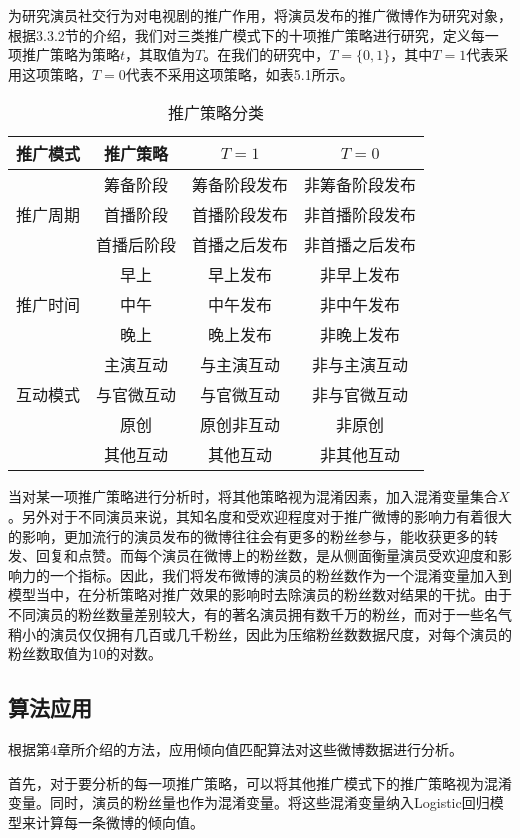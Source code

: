 为研究演员社交行为对电视剧的推广作用，将演员发布的推广微博作为研究对象，根据3.3.2节的介绍，我们对三类推广模式下的十项推广策略进行研究，定义每一项推广策略为策略$t$，其取值为$T$。在我们的研究中，$T = \{0, 1\}$，其中$T = 1$代表采用这项策略，$T = 0$代表不采用这项策略，如表5.1所示。

\begin{table}[!htbp]
\centering
\caption{推广策略分类}
\begin{tabular}{|c|c|c|c|} \hline
推广模式&推广策略&$T=1$&$T=0$\\ \hline
\multirow{3}{*}{推广周期} & 筹备阶段&筹备阶段发布&非筹备阶段发布\\%
&首播阶段&首播阶段发布&非首播阶段发布\\%
&首播后阶段&首播之后发布&非首播之后发布\\ \hline
\multirow{3}{*}{推广时间} &早上&早上发布&非早上发布\\%
&中午&中午发布&非中午发布\\%
&晚上&晚上发布&非晚上发布\\ \hline
\multirow{3}{*}{互动模式} &主演互动&与主演互动&非与主演互动\\%
&与官微互动&与官微互动&非与官微互动\\%
&原创&原创非互动&非原创\\ 
&其他互动&其他互动&非其他互动\\ \hline
\end{tabular}
\end{table}

当对某一项推广策略进行分析时，将其他策略视为混淆因素，加入混淆变量集合$X$。另外对于不同演员来说，其知名度和受欢迎程度对于推广微博的影响力有着很大的影响，更加流行的演员发布的微博往往会有更多的粉丝参与，能收获更多的转发、回复和点赞。而每个演员在微博上的粉丝数，是从侧面衡量演员受欢迎度和影响力的一个指标。因此，我们将发布微博的演员的粉丝数作为一个混淆变量加入到模型当中，在分析策略对推广效果的影响时去除演员的粉丝数对结果的干扰。由于不同演员的粉丝数量差别较大，有的著名演员拥有数千万的粉丝，而对于一些名气稍小的演员仅仅拥有几百或几千粉丝，因此为压缩粉丝数数据尺度，对每个演员的粉丝数取值为10的对数。

\subsection{算法应用}

根据第4章所介绍的方法，应用倾向值匹配算法对这些微博数据进行分析。

首先，对于要分析的每一项推广策略，可以将其他推广模式下的推广策略视为混淆变量。同时，演员的粉丝量也作为混淆变量。将这些混淆变量纳入Logistic回归模型来计算每一条微博的倾向值。

